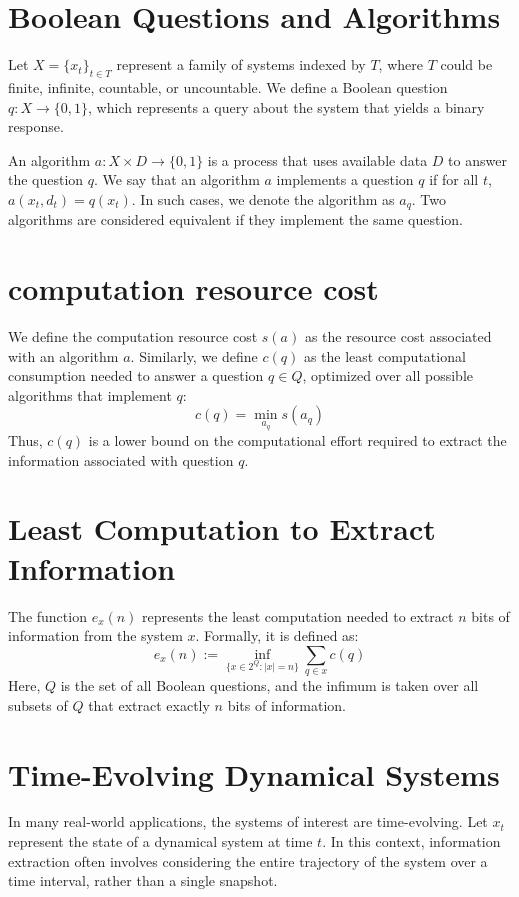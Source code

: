 \documentclass[11pt,a4paper]{article}
\theoremstyle{definition}
\theoremstyle{remark}
\numberwithin{equation}{section}
\begin{document}
\section{Boolean Questions and Algorithms}
Let \(X = \{x_t\}_{t \in T}\) represent a family of systems indexed by \(T\), where \(T\) could be finite, infinite, countable, or uncountable. We define a Boolean question \(q: X \rightarrow \{0, 1\}\), which represents a query about the system that yields a binary response.

An algorithm \(a: X \times D \rightarrow \{0, 1\}\) is a process that uses available data \(D\) to answer the question \(q\). We say that an algorithm \(a\) implements a question \(q\) if for all \(t\), \(a(x_t, d_t) = q(x_t)\). In such cases, we denote the algorithm as \(a_q\). Two algorithms are considered equivalent if they implement the same question.

\section{computation resource cost}
We define the computation resource cost \(s(a)\) as the resource cost associated with an algorithm \(a\). Similarly, we define \(c(q)\) as the least computational consumption needed to answer a question \(q \in Q\), optimized over all possible algorithms that implement \(q\):
\[
c(q) = \min_{a_q} s(a_q)
\]
Thus, \(c(q)\) is a lower bound on the computational effort required to extract the information associated with question \(q\).

\section{Least Computation to Extract Information}
The function \(e_x(n)\) represents the least computation needed to extract \(n\) bits of information from the system \(x\). Formally, it is defined as:
\[
e_x(n) := \inf_{\{x \in 2^Q : |x|=n\}} \sum_{q \in x} c(q)
\]
Here, \(Q\) is the set of all Boolean questions, and the infimum is taken over all subsets of \(Q\) that extract exactly \(n\) bits of information.

\section{Time-Evolving Dynamical Systems}
In many real-world applications, the systems of interest are time-evolving. Let \(x_t\) represent the state of a dynamical system at time \(t\). In this context, information extraction often involves considering the entire trajectory of the system over a time interval, rather than a single snapshot.
\end{document}

